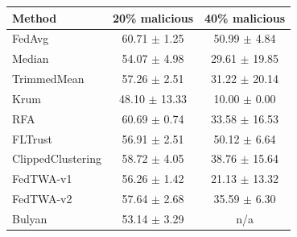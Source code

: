 \begin{tabular}{lcc}
\toprule
Method & 20\% malicious & 40\% malicious \\
\midrule
FedAvg & 60.71 $\pm$ 1.25 & 50.99 $\pm$ 4.84 \\
Median & 54.07 $\pm$ 4.98 & 29.61 $\pm$ 19.85 \\
TrimmedMean & 57.26 $\pm$ 2.51 & 31.22 $\pm$ 20.14 \\
Krum & 48.10 $\pm$ 13.33 & 10.00 $\pm$ 0.00 \\
RFA & 60.69 $\pm$ 0.74 & 33.58 $\pm$ 16.53 \\
FLTrust & 56.91 $\pm$ 2.51 & 50.12 $\pm$ 6.64 \\
ClippedClustering & 58.72 $\pm$ 4.05 & 38.76 $\pm$ 15.64 \\
FedTWA-v1 & 56.26 $\pm$ 1.42 & 21.13 $\pm$ 13.32 \\
FedTWA-v2 & 57.64 $\pm$ 2.68 & 35.59 $\pm$ 6.30 \\
Bulyan & 53.14 $\pm$ 3.29 & n/a \\
\bottomrule
\end{tabular}